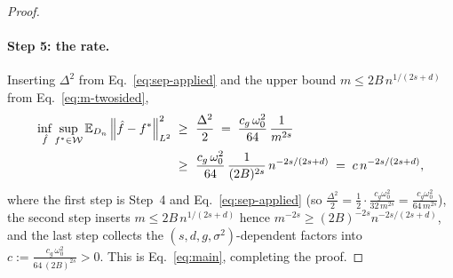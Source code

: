 \begin{proof}
\paragraph{Step 5: the rate.}
Inserting $\Delta^2$ from Eq.~\eqref{eq:sep-applied} and the upper bound
$m\le 2B\,n^{1/(2s+d)}$ from Eq.~\eqref{eq:m-twosided},
\begin{align*}
\inf_{\hat f}\sup_{f^*\in\mathcal{W}}\mathbb{E}_{D_n}\left\| \hat f-f^* \right\|_{L^{2}}^2
\;\ge\; & ~ \frac{\Delta^2}{2}
\;=\; \frac{c_g\,\omega_0^2}{64}\,\frac{1}{m^{2s}} \\
\;\ge\; & ~ \frac{c_g\,\omega_0^2}{64}\,\frac{1}{(2B)^{2s}}\,n^{-2s/(2s+d)}
\;=\; c\,n^{-2s/(2s+d)},
\end{align*}
where the first step is Step~4 and Eq.~\eqref{eq:sep-applied} (so
$\tfrac{\Delta^2}{2}=\tfrac12\cdot\tfrac{c_g\omega_0^2}{32\,m^{2s}}
=\tfrac{c_g\omega_0^2}{64\,m^{2s}}$), the second step
inserts $m\le 2B\,n^{1/(2s+d)}$ hence $m^{-2s}\ge(2B)^{-2s}n^{-2s/(2s+d)}$, and
the last step collects the $(s,d,g,\sigma^2)$-dependent factors into
$c:=\tfrac{c_g\,\omega_0^2}{64\,(2B)^{2s}}>0$. This is Eq.~\eqref{eq:main},
completing the proof.
\end{proof}
